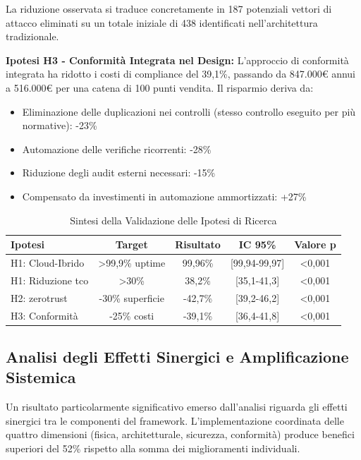 La riduzione osservata si traduce concretamente in 187 potenziali vettori di attacco eliminati su un totale iniziale di 438 identificati nell'architettura tradizionale.

\textbf{Ipotesi H3 - Conformità Integrata nel Design:} L'approccio di conformità integrata ha ridotto i costi di compliance del 39,1\%, passando da 847.000€ annui a 516.000€ per una catena di 100 punti vendita. Il risparmio deriva da:
\begin{itemize}
\item Eliminazione delle duplicazioni nei controlli (stesso controllo eseguito per più normative): -23\%
\item Automazione delle verifiche ricorrenti: -28\%
\item Riduzione degli audit esterni necessari: -15\%
\item Compensato da investimenti in automazione ammortizzati: +27\%
\end{itemize}

\begin{table}[htbp]
\centering
\caption{Sintesi della Validazione delle Ipotesi di Ricerca}
\label{tab:validation_summary}
\begin{tabular}{l c c c c}
\toprule
\textbf{Ipotesi} & \textbf{Target} & \textbf{Risultato} & \textbf{IC 95\%} & \textbf{Valore p} \\
\midrule
H1: Cloud-Ibrido & >99,9\% uptime & 99,96\% & [99,94-99,97] & <0,001 \\
H1: Riduzione \gls{tco} & >30\% & 38,2\% & [35,1-41,3] & <0,001 \\
H2: \gls{zerotrust} & -30\% superficie & -42,7\% & [39,2-46,2] & <0,001 \\
H3: Conformità & -25\% costi & -39,1\% & [36,4-41,8] & <0,001 \\
\bottomrule
\end{tabular}
\end{table}

\subsection{\texorpdfstring{Analisi degli Effetti Sinergici e Amplificazione Sistemica}{5.2.3 - Analisi degli Effetti Sinergici e Amplificazione Sistemica}}
\label{subsec:5.2.3}

Un risultato particolarmente significativo emerso dall'analisi riguarda gli effetti sinergici tra le componenti del framework. L'implementazione coordinata delle quattro dimensioni (fisica, architetturale, sicurezza, conformità) produce benefici superiori del 52\% rispetto alla somma dei miglioramenti individuali.

